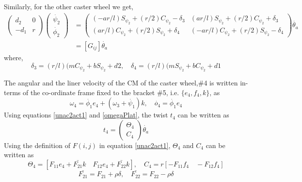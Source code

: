 Similarly, for the other caster wheel we get,
\begin{align}
\label{unac2act2}
\begin{pmatrix}
d_2&0\\-d_1 &r
\end{pmatrix}
\begin{pmatrix}
\dot{\psi_2}\\ \dot{\phi_2}
\end{pmatrix}
&=\begin{pmatrix}
(-ar/l)S_{\psi_2}+(r/2)C_{\psi_2}-\delta_3 & 
(ar/l)S_{\psi_2}+(r/2)C_{\psi_2}+\delta_3 \\
(ar/l)C_{\psi_2}+(r/2)S_{\psi_2}+\delta_4 & 
(-ar/l)C_{\psi_2}+(r/2)S_{\psi_2}-\delta_4 
\end{pmatrix}\dot{\theta_a}\nonumber \\
&=[G_{ij}]\dot{\theta_a}
\end{align}
where, 
\[ \delta_3=(r/l)(mC_{\psi_2}+bS_{\psi_2}+d2, \quad  \delta_4=(r/l)(mS_{\psi_2}+bC_{\psi_2}+d1 \]




 The angular and the liner velocity of the CM of the caster wheel,\#4 is  written in-terms of the co-ordinate frame fixed to the bracket \#5, i.e. $\{e_4,f_4,k\}$, as
\begin{equation}
\label{omegacastor1}
\omega_4=\dot{\phi_1}e_4+(\omega_3+\dot{\psi_1})k, \quad
\dot{o_4}=\dot{\phi_1}e_4
\end{equation}
Using equations \ref{unac2act1} and \ref{omegaPlat}, the twist $t_4$ can be written as
\begin{equation}
\label{twist4}
t_4=\begin{pmatrix}
\Theta_4\\C_4
\end{pmatrix}\dot{\theta_a}
\end{equation}
Using the definition of $F(i,j)$ in  equation \ref{unac2act1}, $\Theta_4$ and $C_4$ can be written as 
\[ \Theta_4=[F_{11}e_4+\bar{F_{21}}k \quad F_{12}e_4+\bar{F_{22}}k],\quad 
C_4=r[-F_{11}f_4 \quad -F_{12}f_4]\]
\[\bar{F_{21}}=F_{21}+\rho \delta, \quad \bar{F_{22}}=F_{22}-\rho\delta\]

